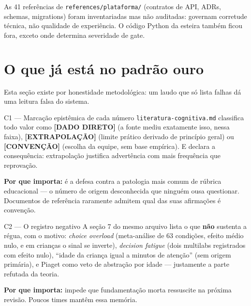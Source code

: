 \documentclass[11pt,a4paper]{article}
\begin{document}
As 41 refer\^encias de \texttt{references/plataforma/} (contratos de API, ADRs, schemas,
migrations) foram inventariadas mas n\~ao auditadas: governam corretude t\'ecnica, n\~ao qualidade
de experi\^encia. O c\'odigo Python da esteira tamb\'em ficou fora, exceto onde determina
severidade de gate.

\section{O que j\'a est\'a no padr\~ao ouro}
\label{sec:credito}

Esta se\c{c}\~ao existe por honestidade metodol\'ogica: um laudo que s\'o lista falhas d\'a uma
leitura falsa do sistema.

\begin{creditobox}{C1 --- Marca\c{c}\~ao epist\^emica de cada n\'umero}
\texttt{literatura-cognitiva.md} classifica todo valor como \textbf{[DADO DIRETO]} (a fonte mediu
exatamente isso, nessa faixa), \textbf{[EXTRAPOLA\c{C}\~AO]} (limite pr\'atico derivado de
princ\'ipio geral) ou \textbf{[CONVEN\c{C}\~AO]} (escolha da equipe, sem base emp\'irica). E
declara a consequ\^encia: extrapola\c{c}\~ao justifica advert\^encia com mais frequ\^encia que
reprova\c{c}\~ao.

\textbf{Por que importa:} \'e a defesa contra a patologia mais comum de r\'ubrica educacional ---
o n\'umero de origem desconhecida que ningu\'em ousa questionar. Documentos de refer\^encia
raramente admitem qual das suas afirma\c{c}\~oes \'e conven\c{c}\~ao.
\end{creditobox}

\begin{creditobox}{C2 --- O registro negativo}
A se\c{c}\~ao 7 do mesmo arquivo lista o que \textbf{n\~ao} sustenta a r\'egua, com o motivo:
\emph{choice overload} (meta-an\'alise de 63 condi\c{c}\~oes, efeito m\'edio nulo, e em
crian\c{c}as o sinal se inverte), \emph{decision fatigue} (dois multilabs registrados com efeito
nulo), ``idade da crian\c{c}a igual a minutos de aten\c{c}\~ao'' (sem origem prim\'aria), e Piaget
como veto de abstra\c{c}\~ao por idade --- justamente a parte refutada da teoria.

\textbf{Por que importa:} impede que fundamenta\c{c}\~ao morta ressuscite na pr\'oxima revis\~ao.
Poucos times mant\^em essa mem\'oria.
\end{creditobox}
\end{document}
